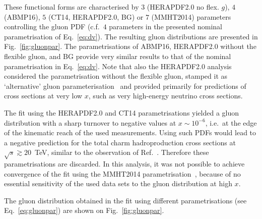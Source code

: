 \documentclass[12pt]{article}
\begin{document}
These functional forms are characterised by $3$ (HERAPDF2.0 no flex. $g$), $4$ (ABMP16), $5$ (CT14, HERAPDF2.0, BG) or $7$ (MMHT2014) parameters controlling the gluon PDF (c.f.\ $4$ parameters in the presented nominal parametrisation of Eq.~\ref{eq:dv}). 
The resulting gluon distributions are presented in Fig.~\ref{fig:gluonpar}. The parametrisations of ABMP16, HERAPDF2.0 without the flexible gluon, and BG provide very similar results to that of the nominal parametrisation in Eq.~\ref{eq:dv}. 
Note that also the HERAPDF2.0 analysis considered the parametrisation without the flexible gluon, stamped it as `alternative' gluon parameterisation~\cite{Abramowicz:2015mha} and provided primarily for predictions of cross sections at very low $x$, such as very high-energy neutrino cross sections.

The fit using the HERAPDF2.0 and CT14 parametrisations yielded a gluon distribution with a sharp turnover to negative values 
at $x \sim 10^{-6}$, i.e.\ at the edge of the kinematic reach of the used measurements. Using such PDFs would 
lead to a negative prediction for the total charm hadroproduction cross sections at $\sqrt{s} \gtrsim 20$~TeV, similar to the observation of Ref.~\cite{Accardi:2016ndt}. Therefore these parametrisations are discarded. In this analysis, it was not possible to achieve convergence of the fit using the MMHT2014 parametrisation~\cite{Harland-Lang:2014zoa}, because of no essential sensitivity of the used data sets to the gluon distribution at high $x$.


The gluon distribution obtained in the fit using different parametrisations (see Eq.~\ref{eq:gluonpar}) are shown on Fig.~\ref{fig:gluonpar}.
\end{document}
